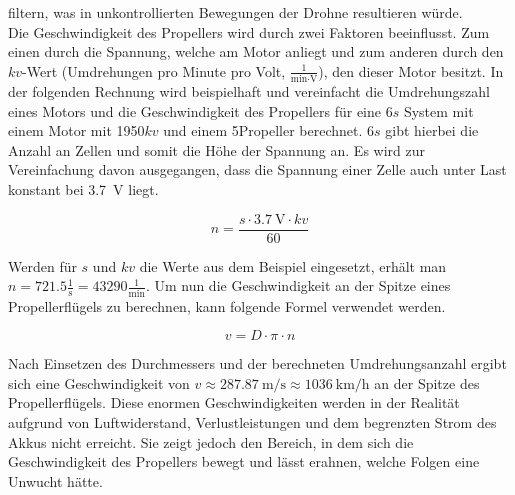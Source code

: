         filtern, was in unkontrollierten Bewegungen der Drohne resultieren würde. \\
        \newpage
        Die Geschwindigkeit des Propellers wird durch zwei Faktoren beeinflusst. Zum einen durch die Spannung,
        welche am Motor anliegt und zum anderen durch den $kv$-Wert (Umdrehungen pro Minute pro Volt,
        $\frac{1}{\si{\minute}\cdot \si{\volt}}$), den dieser Motor besitzt. In der folgenden Rechnung wird
        beispielhaft und vereinfacht die Umdrehungszahl eines Motors und die Geschwindigkeit des Propellers
        für eine 6$s$ System mit einem Motor mit 1950$kv$ und einem 5\dq Propeller berechnet. 6$s$ gibt hierbei
        die Anzahl an Zellen und somit die Höhe der Spannung an. Es wird zur Vereinfachung davon ausgegangen,
        dass die Spannung einer Zelle auch unter Last konstant bei \qty{3,7}{\volt} liegt.
    
        \begin{equation}
            n=\frac{s\cdot\qty{3,7}{\volt}\cdot kv}{60}
        \end{equation}

        Werden für $s$ und $kv$ die Werte aus dem Beispiel eingesetzt, erhält man
        $n=\num{721,5} \frac{1}{\si{\second}} = \num{43290} \frac{1}{\si{\minute}}$. Um nun die Geschwindigkeit
        an der Spitze eines Propellerflügels zu berechnen, kann folgende Formel verwendet werden.
        
        \begin{equation}
            v=D\cdot \pi \cdot n
        \end{equation}

        Nach Einsetzen des Durchmessers und der berechneten Umdrehungsanzahl ergibt sich eine Geschwindigkeit
        von $v\approx \qty{287,87}{\meter\per\second} \approx \qty{1036}{\kilo\meter\per\hour}$ an der Spitze
        des Propellerflügels. Diese enormen Geschwindigkeiten werden in der Realität aufgrund von Luftwiderstand,
        Verlustleistungen und dem begrenzten Strom des Akkus nicht erreicht. Sie zeigt jedoch den Bereich, in dem
        sich die Geschwindigkeit des Propellers bewegt und lässt erahnen, welche Folgen eine Unwucht hätte.
